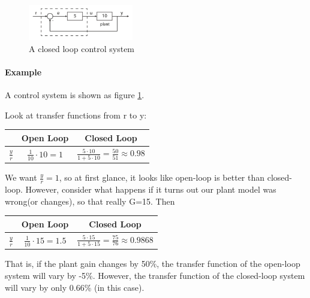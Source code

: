 \begin{figure}
  \centering
  \includegraphics[width=1.8in]{fig/fig_control_example.png}
  \caption{A closed loop control system}\label{fig_control_system}
\end{figure}


\paragraph{Example} A control system is shown as figure \ref{fig_control_system}.

Look at transfer functions from r to y:

\begin{center}
    \begin{tabular}{c|c|c}
        & Open Loop & Closed Loop \\
        \hline
      $\frac{y}{r}$ & $\frac{1}{10} \cdot 10 = 1$ & $\frac{5 \cdot 10}{1+5 \cdot 10} = \frac{50}{51} \approx 0.98$ \\
    \end{tabular}
\end{center}

We want $\frac{y}{r}=1$, so at first glance, it looks like open-loop is better than closed-loop. However, consider what happens if it turns out our plant model was wrong(or changes), so that really G=15. Then

\begin{center}
    \begin{tabular}{c|c|c}
        & Open Loop & Closed Loop \\
        \hline
      $\frac{y}{r}$ & $\frac{1}{10} \cdot 15 = 1.5$ & $\frac{5 \cdot 15}{1+5 \cdot 15} = \frac{75}{76} \approx 0.9868$ \\
    \end{tabular}
\end{center}

That is, if the plant gain changes by 50\%, the transfer function of the open-loop system will vary by -5\%. However, the transfer function of the closed-loop system will vary by only 0.66\% (in this case).


